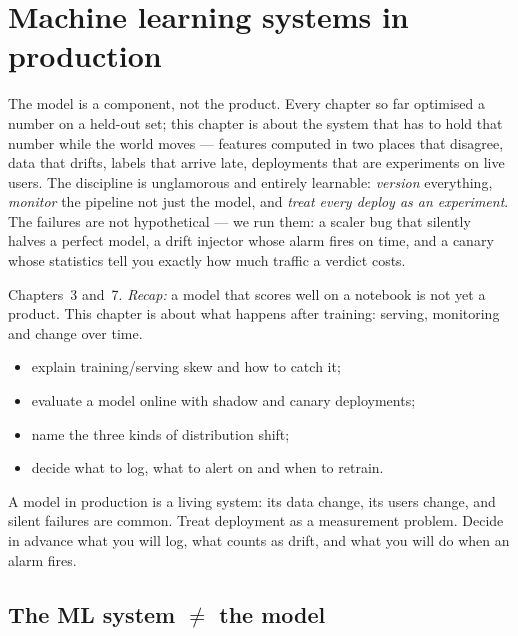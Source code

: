 \chapter{Machine learning systems in production}
\label{ch:prod}

The model is a component, not the product. Every chapter so far
optimised a number on a held-out set; this chapter is about the
system that has to hold that number while the world moves ---
features computed in two places that disagree, data that drifts,
labels that arrive late, deployments that are experiments on live
users. The discipline is unglamorous and entirely learnable:
\emph{version} everything, \emph{monitor} the pipeline not just the
model, and \emph{treat every deploy as an experiment}. The failures
are not hypothetical --- we run them: a scaler bug that silently
halves a perfect model, a drift injector whose alarm fires on time,
and a canary whose statistics tell you exactly how much traffic a
verdict costs.

\begin{rulebox}
Chapters~3 and~7. \emph{Recap:} a model that scores well on a notebook is not yet a product. This chapter is about what happens after training: serving, monitoring and change over time.
\end{rulebox}
\begin{wins}
\begin{itemize}
\item explain training/serving skew and how to catch it;
\item evaluate a model online with shadow and canary deployments;
\item name the three kinds of distribution shift;
\item decide what to log, what to alert on and when to retrain.
\end{itemize}
\end{wins}
\begin{principle}
A model in production is a living system: its data change, its users change, and silent failures are common. Treat deployment as a measurement problem. Decide in advance what you will log, what counts as drift, and what you will do when an alarm fires.
\end{principle}

\section{The ML system $\neq$ the model}
\label{sec:system}

